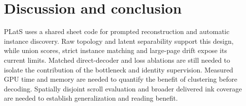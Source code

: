 \section{Discussion and conclusion}
PLatS uses a shared sheet code for prompted reconstruction and automatic
instance discovery. Raw topology and latent separability support this design,
while union scores, strict instance matching and large-page drift expose its
current limits. Matched direct-decoder and loss ablations are still needed to
isolate the contribution of the bottleneck and identity supervision. Measured
GPU time and memory are needed to quantify the benefit of clustering before
decoding. Spatially disjoint scroll evaluation and broader delivered ink
coverage are needed to establish generalization and reading benefit.

